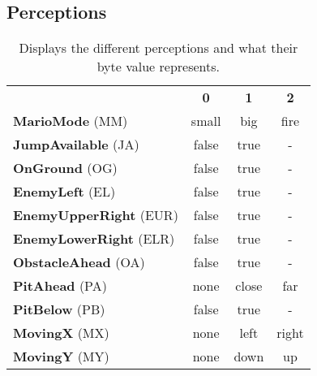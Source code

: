 

\begin{appendices}

\setcounter{table}{0}
\renewcommand\thetable{\thesection\arabic{table}}
\setcounter{figure}{0}
\renewcommand\thefigure{\thesection\arabic{figure}}
\setcounter{lstlisting}{0}
\renewcommand\thelstlisting{\thesection\arabic{lstlisting}}


\makeatletter
{}
\makeatother

\section{Perceptions}
\label{app:percond}

\vspace{-1\baselineskip}
\begin{table}[h]
  \begin{center} \footnotesize
    \begin{tabular}{ l c c c}
    & \textbf{0} & \textbf{1} & \textbf{2} \\
    \textbf{MarioMode} (MM) & small & big & fire \\
    \textbf{JumpAvailable} (JA) & false & true & -  \\
    \textbf{OnGround} (OG) & false & true & -  \\
    \textbf{EnemyLeft} (EL) & false & true & -  \\
    \textbf{EnemyUpperRight} (EUR) & false & true & -  \\
    \textbf{EnemyLowerRight} (ELR) & false & true & -  \\
    \textbf{ObstacleAhead} (OA) & false & true & -  \\
    \textbf{PitAhead} (PA) & none & close & far \\
    \textbf{PitBelow} (PB) & false & true & -  \\
    \textbf{MovingX} (MX) & none & left & right \\
    \textbf{MovingY} (MY) & none & down & up \\
    \end{tabular}
    \end{center}
  \caption{Displays the different perceptions and what their byte value represents.}
  \label{tab:AgKey}
\end{table}


\end{appendices}
